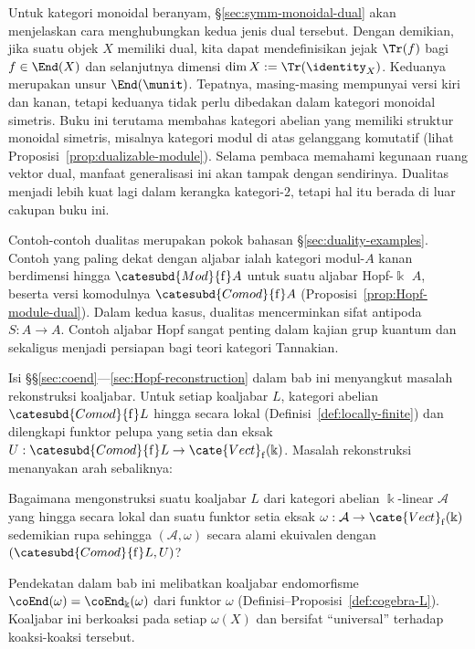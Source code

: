 Untuk kategori monoidal beranyam, \S\ref{sec:symm-monoidal-dual} akan
menjelaskan cara menghubungkan kedua jenis dual tersebut. Dengan demikian,
jika suatu objek $X$ memiliki dual, kita dapat mendefinisikan jejak
$\Tr(f)$ bagi $f\in\End(X)$ dan selanjutnya dimensi
$\dim X:=\Tr(\identity_X)$. Keduanya merupakan unsur $\End(\munit)$.
Tepatnya, masing-masing mempunyai versi kiri dan kanan, tetapi keduanya tidak
perlu dibedakan dalam kategori monoidal simetris. Buku ini terutama
membahas kategori abelian yang memiliki struktur monoidal simetris,
misalnya kategori modul di atas gelanggang komutatif (lihat
Proposisi~\ref{prop:dualizable-module}). Selama pembaca memahami kegunaan ruang
vektor dual, manfaat generalisasi ini akan tampak dengan sendirinya. Dualitas
menjadi lebih kuat lagi dalam kerangka kategori-$2$, tetapi hal itu berada di
luar cakupan buku ini.

Contoh-contoh dualitas merupakan pokok bahasan \S\ref{sec:duality-examples}.
Contoh yang paling dekat dengan aljabar ialah kategori modul-$A$ kanan
berdimensi hingga $\catesubd{Mod}{\mathrm{f}}A$ untuk suatu aljabar
Hopf-$\Bbbk$ $A$, beserta versi komodulnya
$\catesubd{Comod}{\mathrm{f}}A$ (Proposisi~\ref{prop:Hopf-module-dual}). Dalam
kedua kasus, dualitas mencerminkan sifat antipoda $S:A\to A$. Contoh aljabar
Hopf sangat penting dalam kajian grup kuantum dan sekaligus menjadi persiapan
bagi teori kategori Tannakian.

Isi \S\S\ref{sec:coend}---\ref{sec:Hopf-reconstruction} dalam bab ini
menyangkut masalah rekonstruksi koaljabar. Untuk setiap koaljabar $L$, kategori
abelian $\catesubd{Comod}{\mathrm{f}}L$ hingga secara lokal
(Definisi~\ref{def:locally-finite}) dan dilengkapi funktor pelupa yang setia
dan eksak
$U:\catesubd{Comod}{\mathrm{f}}L\to\cate{Vect}_{\mathrm{f}}(\Bbbk)$.
Masalah rekonstruksi menanyakan arah sebaliknya:
\begin{center}\begin{minipage}{0.8\textwidth}
	Bagaimana mengonstruksi suatu koaljabar $L$ dari kategori abelian
	$\Bbbk$-linear $\mathcal{A}$ yang hingga secara lokal dan suatu funktor
	setia eksak
	$\omega:\mathcal{A}\to\cate{Vect}_{\mathrm{f}}(\Bbbk)$ sedemikian rupa
	sehingga $(\mathcal{A},\omega)$ secara alami ekuivalen dengan
	$(\catesubd{Comod}{\mathrm{f}}L,U)$?
\end{minipage}\end{center}
Pendekatan dalam bab ini melibatkan koaljabar endomorfisme
$\coEnd(\omega)=\coEnd_{\Bbbk}(\omega)$ dari funktor $\omega$
(Definisi--Proposisi~\ref{def:cogebra-L}). Koaljabar ini berkoaksi pada setiap
$\omega(X)$ dan bersifat ``universal'' terhadap koaksi-koaksi tersebut.

